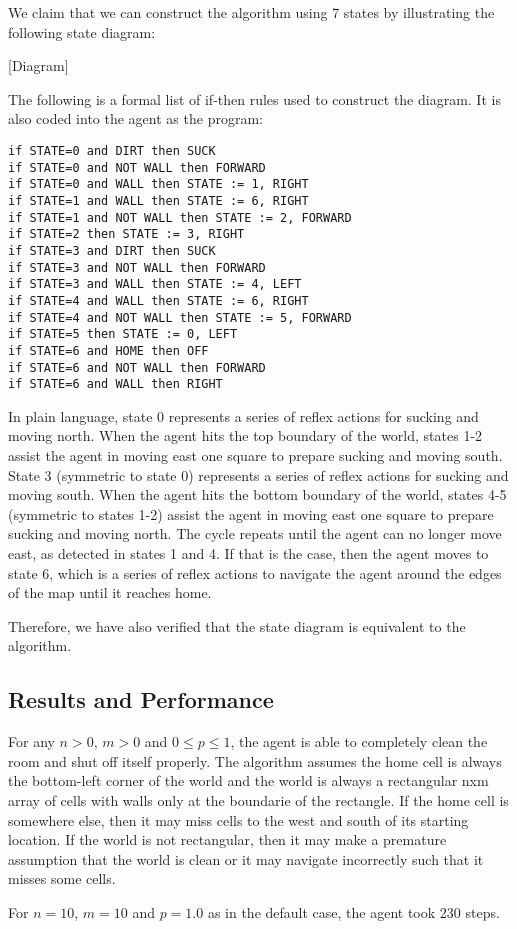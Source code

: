 We claim that we can construct the algorithm using 7 states by illustrating the following state diagram:

[Diagram]

The following is a formal list of if-then rules used to construct the diagram. It is also coded into the agent as the program:

\begin{verbatim}
if STATE=0 and DIRT then SUCK
if STATE=0 and NOT WALL then FORWARD
if STATE=0 and WALL then STATE := 1, RIGHT
if STATE=1 and WALL then STATE := 6, RIGHT
if STATE=1 and NOT WALL then STATE := 2, FORWARD
if STATE=2 then STATE := 3, RIGHT
if STATE=3 and DIRT then SUCK
if STATE=3 and NOT WALL then FORWARD
if STATE=3 and WALL then STATE := 4, LEFT
if STATE=4 and WALL then STATE := 6, RIGHT
if STATE=4 and NOT WALL then STATE := 5, FORWARD
if STATE=5 then STATE := 0, LEFT
if STATE=6 and HOME then OFF
if STATE=6 and NOT WALL then FORWARD
if STATE=6 and WALL then RIGHT
\end{verbatim}

In plain language, state 0 represents a series of reflex actions for sucking and moving north. When the agent hits the top boundary of the world, states 1-2 assist the agent in moving east one square to prepare sucking and moving south. State 3 (symmetric to state 0) represents a series of reflex actions for sucking and moving south. When the agent hits the bottom boundary of the world, states 4-5 (symmetric to states 1-2) assist the agent in moving east one square to prepare sucking and moving north. The cycle repeats until the agent can no longer move east, as detected in states 1 and 4. If that is the case, then the agent moves to state 6, which is a series of reflex actions to navigate the agent around the edges of the map until it reaches home.

Therefore, we have also verified that the state diagram is equivalent to the algorithm.

\subsection{Results and Performance}

For any $n>0$, $m>0$ and $0\le p \le1$, the agent is able to completely clean the room and shut off itself properly. The algorithm assumes the home cell is always the bottom-left corner of the world and the world is always a rectangular nxm array of cells with walls only at the boundarie of the rectangle. If the home cell is somewhere else, then it may miss cells to the west and south of its starting location. If the world is not rectangular, then it may make a premature assumption that the world is clean or it may navigate incorrectly such that it misses some cells.

For $n=10$, $m=10$ and $p=1.0$ as in the default case, the agent took 230 steps.


